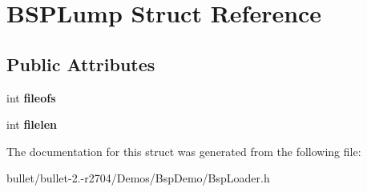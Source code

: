\hypertarget{struct_b_s_p_lump}{\section{B\+S\+P\+Lump Struct Reference}
\label{struct_b_s_p_lump}
}
\subsection*{Public Attributes}
\begin{DoxyCompactItemize}
\item 
\hypertarget{struct_b_s_p_lump_a37ab73ba08720e68c33233f32cf0f94c}{int {\bfseries fileofs}}\label{struct_b_s_p_lump_a37ab73ba08720e68c33233f32cf0f94c}

\item 
\hypertarget{struct_b_s_p_lump_a6441b8a27eb40fddb9ef53eadecf74b5}{int {\bfseries filelen}}\label{struct_b_s_p_lump_a6441b8a27eb40fddb9ef53eadecf74b5}

\end{DoxyCompactItemize}


The documentation for this struct was generated from the following file\+:\begin{DoxyCompactItemize}
\item 
bullet/bullet-\/2.-\/r2704/\+Demos/\+Bsp\+Demo/Bsp\+Loader.\+h\end{DoxyCompactItemize}
